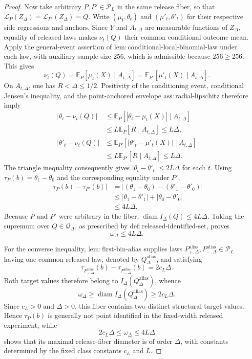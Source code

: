 \documentclass{article}
\begin{document}
\begin{proof}
Now take arbitrary \(P,P'\in\mathcal P_L\) in the same release fiber, so that
\(\mathcal L_P(Z_\Delta)=\mathcal L_{P'}(Z_\Delta)=Q\).  Write \((\mu_t,\theta_t)\) and \((\mu'_t,\theta'_t)\) for their respective side regressions and anchors.  Since \(Y\) and \(A_{t,\Delta}\) are measurable functions of \(Z_\Delta\), equality of released laws makes \(\nu_t(Q)\) their common conditional outcome mean.  Apply the general-event assertion of \(\mathrm{lem:conditional\text{-}local\text{-}binomial\text{-}law}\) under each law, with auxiliary sample size \(256\), which is admissible because \(256\geq256\).  This gives
\[
 \nu_t(Q)
 =\mathbb E_P[\mu_t(X)\mid A_{t,\Delta}]
 =\mathbb E_{P'}[\mu'_t(X)\mid A_{t,\Delta}].
\]
On \(A_{t,\Delta}\), one has \(R<\Delta\leq1/2\).  Positivity of the conditioning event, conditional Jensen's inequality, and the point-anchored envelope \(\mathrm{ass:radial\text{-}lipschitz}\) therefore imply
\[
 \begin{aligned}
 |\theta_t-\nu_t(Q)|
 &\leq \mathbb E_P\!\left[|\theta_t-\mu_t(X)|\mid A_{t,\Delta}\right] \\
 &\leq L\mathbb E_P[R\mid A_{t,\Delta}]
 \leq L\Delta,
 \\[3pt]
 |\theta'_t-\nu_t(Q)|
 &\leq \mathbb E_{P'}\!\left[|\theta'_t-\mu'_t(X)|\mid A_{t,\Delta}\right] \\
 &\leq L\mathbb E_{P'}[R\mid A_{t,\Delta}]
 \leq L\Delta.
 \end{aligned}
\]
The triangle inequality consequently gives \(|\theta_t-\theta'_t|\leq2L\Delta\) for each \(t\).  Using \(\tau_P(b)=\theta_1-\theta_0\) and the corresponding equality under \(P'\),
\[
 \begin{aligned}
 |\tau_P(b)-\tau_{P'}(b)|
 &=| (\theta_1-\theta_0)-(\theta'_1-\theta'_0)| \\
 &\leq |\theta_1-\theta'_1|+|\theta_0-\theta'_0| \\
 &\leq4L\Delta.
 \end{aligned}
\]
Because \(P\) and \(P'\) were arbitrary in the fiber, \(\operatorname{diam}I_\Delta(Q)\leq4L\Delta\).  Taking the supremum over \(Q\in\mathcal Q_\Delta\), as prescribed by \(\mathrm{def:released\text{-}identified\text{-}set}\), proves
\[
 \omega_\Delta\leq4L\Delta.
\]

For the converse inequality, \(\mathrm{lem:first\text{-}bin\text{-}alias}\) supplies laws \(P^{\mathrm{alias}}_{+,\Delta},P^{\mathrm{alias}}_{-,\Delta}\in\mathcal P_L\) having one common released law, denoted by \(Q^{\mathrm{alias}}_\Delta\), and satisfying
\[
 \tau_{P^{\mathrm{alias}}_{+,\Delta}}(b)
 -\tau_{P^{\mathrm{alias}}_{-,\Delta}}(b)
 =2c_L\Delta.
\]
Both target values therefore belong to \(I_\Delta(Q^{\mathrm{alias}}_\Delta)\), whence
\[
 \omega_\Delta
 \geq\operatorname{diam}I_\Delta(Q^{\mathrm{alias}}_\Delta)
 \geq2c_L\Delta.
\]
Since \(c_L>0\) and \(\Delta>0\), this fiber contains two distinct structural target values.  Hence \(\tau_P(b)\) is generally not point identified in the fixed-width released experiment, while
\[
 2c_L\Delta\leq\omega_\Delta\leq4L\Delta
\]
shows that its maximal release-fiber diameter is of order \(\Delta\), with constants determined by the fixed class constants \(c_L\) and \(L\).
\end{proof}
\end{document}
